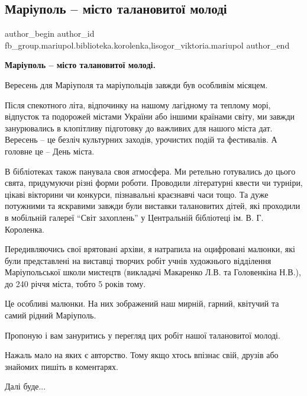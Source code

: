  
 
 
 
 

\subsection{Маріуполь – місто талановитої молоді}
\label{sec:22_09_2023.fb.fb_group.mariupol.biblioteka.korolenka.1.mariupol_misto_talanovytoj_molodi}
 
\ifcmt
 author_begin
   author_id fb_group.mariupol.biblioteka.korolenka,lisogor_viktoria.mariupol
 author_end
\fi

\textbf{Маріуполь – місто талановитої молоді.}

Вересень для Маріуполя та маріупольців завжди був особливім місяцем.

Після спекотного літа, відпочинку на нашому лагідному та теплому морі,
відпусток та подорожей містами України або іншими країнами світу, ми завжди
занурювались в клопітливу підготовку до важливих для нашого міста дат. Вересень
– це безліч культурних заходів, урочистих подій та фестивалів. А головне це –
День міста.

В бібліотеках також панувала своя атмосфера. Ми ретельно готувались до цього
свята, придумуючи різні форми роботи. Проводили літературні квести чи турніри,
цікаві вікторини чи конкурси, пізнавальні краєзнавчі часи тощо. Та дуже
потужними та яскравими завжди були виставки талановитих дітей, які проходили в
мобільній галереї \enquote{Світ захоплень} у Центральній бібліотеці ім. В. Г. Короленка.

Передивляючись свої врятовані архіви, я натрапила на оцифровані малюнки, які
були представлені на виставці творчих робіт учнів художнього відділення
Маріупольської школи мистецтв (викладачі Макаренко Л.В. та Головенкіна Н.В.),
до 240 річчя міста, тобто 5 років тому.

Це особливі малюнки. На них зображений наш мирній, гарний, квітучий та самий рідний Маріуполь.

Пропоную і вам зануритись у перегляд цих робіт нашої талановитої молоді.

Нажаль мало на яких є авторство. Тому якщо хтось впізнає свій, друзів або знайомих пишіть в коментарях.

Далі буде...
